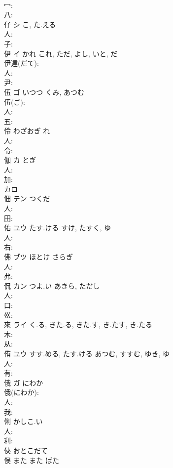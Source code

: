 \documentclass[8pt]{extreport}
\begin{document}
\begin{CJK}{UTF8}{min}
\\	冖: 
\\	八: 
\\	仔	シ	こ, た.える		
\\	人: 
\\	子: 
\\	伊	イ	かれ	これ, ただ, よし, いと, だ	
\\	伊達(だて): 
\\	人: 
\\	尹: 
\\	伍	ゴ	いつつ	くみ, あつむ	
\\	伍(ご): 
\\	人: 
\\	五: 
\\	伶		わざおぎ	れ			
\\	人: 
\\	令: 
\\	伽	カ	とぎ		
\\	人: 
\\	加: 
\\	カロ 
\\	佃	テン	つくだ		
\\	人: 
\\	田: 
\\	佑	ユウ	たす.ける	すけ, たすく, ゆ	
\\	人: 
\\	右: 
\\	佛	ブツ	ほとけ	さらぎ	
\\	人: 
\\	弗: 
\\	侃	カン	つよ.い	あきら, ただし	
\\	人: 
\\	口: 
\\	巛: 
\\	來	ライ	く.る, きた.る, きた.す, き.たす, き.たる		
\\	木: 
\\	从: 
\\	侑	ユウ	すす.める, たす.ける	あつむ, すすむ, ゆき, ゆ	
\\	人: 
\\	有: 
\\	俄	ガ	にわか		
\\	俄(にわか): 
\\	人: 
\\	我: 
\\	俐		かしこ.い				
\\	人: 
\\	利: 
\\	俠		おとこだて				
\\	俣	また	また	ばた	

\end{CJK}
\end{document}
